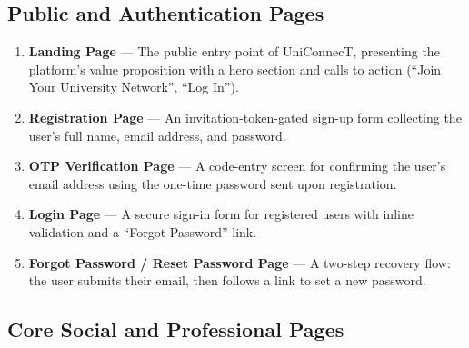 \documentclass[12pt, a4paper]{article}
\begin{document}
\subsection{Public and Authentication Pages}

\begin{enumerate}
    \item \textbf{Landing Page} --- The public entry point of UniConnecT, presenting
    the platform's value proposition with a hero section and calls to action
    (``Join Your University Network'', ``Log In'').

    \item \textbf{Registration Page} --- An invitation-token-gated sign-up form
    collecting the user's full name, email address, and password.

    \item \textbf{OTP Verification Page} --- A code-entry screen for confirming the
    user's email address using the one-time password sent upon registration.

    \item \textbf{Login Page} --- A secure sign-in form for registered users with
    inline validation and a ``Forgot Password'' link.

    \item \textbf{Forgot Password / Reset Password Page} --- A two-step recovery
    flow: the user submits their email, then follows a link to set a new password.
\end{enumerate}

\subsection{Core Social and Professional Pages}
\end{document}
